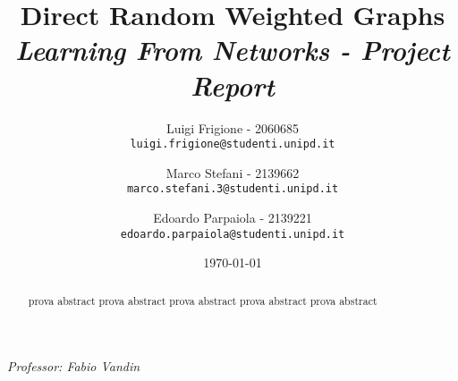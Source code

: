 \title{
    \textbf{Direct Random Weighted Graphs}\\[.5cm]
    
    {\large\emph{Learning From Networks - Project Report}}
}

\author{
  Luigi Frigione - 2060685\\
  \texttt{\small{luigi.frigione@studenti.unipd.it}}
  \and
  Marco Stefani - 2139662\\
  \texttt{\small{marco.stefani.3@studenti.unipd.it}}
  \and
  Edoardo Parpaiola - 2139221\\
  \texttt{\small{edoardo.parpaiola@studenti.unipd.it}}
}

\date{\today}

\maketitle

\begin{abstract}
	prova abstract prova abstract prova abstract prova abstract prova abstract
\end{abstract}

\vfill
{
    \emph{Professor: Fabio Vandin}
}

\newpage

\tableofcontents



